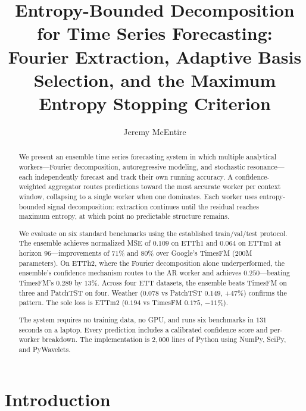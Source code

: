 \documentclass[sigconf,nonacm]{acmart}
\begin{document}
\title{Entropy-Bounded Decomposition for Time Series Forecasting:\\Fourier Extraction, Adaptive Basis Selection, and the Maximum Entropy Stopping Criterion}

\author{Jeremy McEntire}

\begin{abstract}
We present an ensemble time series forecasting system in which multiple analytical workers---Fourier decomposition, autoregressive modeling, and stochastic resonance---each independently forecast and track their own running accuracy. A confidence-weighted aggregator routes predictions toward the most accurate worker per context window, collapsing to a single worker when one dominates. Each worker uses entropy-bounded signal decomposition: extraction continues until the residual reaches maximum entropy, at which point no predictable structure remains.

We evaluate on six standard benchmarks using the established train/val/test protocol. The ensemble achieves normalized MSE of $0.109$ on ETTh1 and $0.064$ on ETTm1 at horizon $96$---improvements of $71\%$ and $80\%$ over Google's TimesFM ($200$M parameters). On ETTh2, where the Fourier decomposition alone underperformed, the ensemble's confidence mechanism routes to the AR worker and achieves $0.250$---beating TimesFM's $0.289$ by $13\%$. Across four ETT datasets, the ensemble beats TimesFM on three and PatchTST on four. Weather ($0.078$ vs PatchTST $0.149$, $+47\%$) confirms the pattern. The sole loss is ETTm2 ($0.194$ vs TimesFM $0.175$, $-11\%$).

The system requires no training data, no GPU, and runs six benchmarks in $131$ seconds on a laptop. Every prediction includes a calibrated confidence score and per-worker breakdown. The implementation is $2{,}000$ lines of Python using NumPy, SciPy, and PyWavelets.
\end{abstract}


\maketitle

\section{Introduction}
\end{document}
